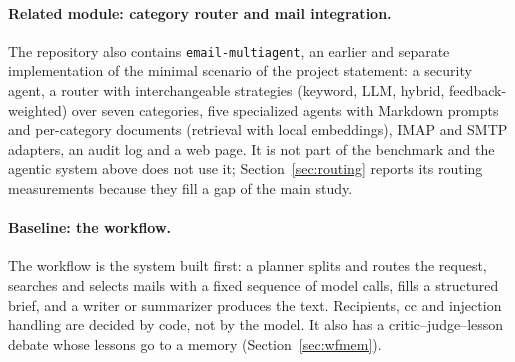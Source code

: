 \documentclass[11pt,a4paper]{article}
\newcommand{\code}[1]{\texttt{#1}}
\begin{document}
\paragraph{Related module: category router and mail integration.}
The repository also contains \code{email-multiagent}, an earlier and separate implementation of the minimal scenario of
the project statement: a security agent, a router with interchangeable strategies (keyword, LLM, hybrid, feedback-weighted) over seven
categories, five specialized agents with Markdown prompts and per-category documents (retrieval with local embeddings),
IMAP and SMTP adapters, an audit log and a web page. It is not part of the benchmark and the agentic system above does not
use it; Section~\ref{sec:routing} reports its routing measurements because they fill a gap of the main study.

\paragraph{Baseline: the workflow.}
The workflow is the system built first: a planner splits and routes the request, searches and selects mails with a
fixed sequence of model calls, fills a structured brief, and a writer or summarizer produces the text. Recipients,
cc and injection handling are decided by code, not by the model. It also has a critic--judge--lesson debate whose
lessons go to a memory (Section~\ref{sec:wfmem}).

\end{document}
